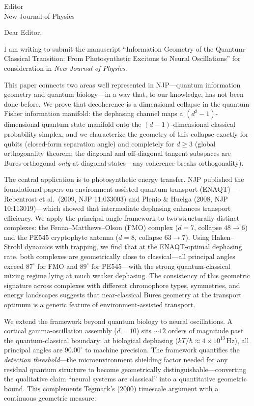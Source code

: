 \documentclass[12pt,a4paper]{letter}
\begin{document}
\begin{letter}{Editor\\New Journal of Physics}

\opening{Dear Editor,}

I am writing to submit the manuscript ``Information Geometry of the Quantum-Classical Transition: From Photosynthetic Excitons to Neural Oscillations'' for consideration in \textit{New Journal of Physics}.

This paper connects two areas well represented in NJP---quantum information geometry and quantum biology---in a way that, to our knowledge, has not been done before. We prove that decoherence is a dimensional collapse in the quantum Fisher information manifold: the dephasing channel maps a $(d^2-1)$-dimensional quantum state manifold onto the $(d-1)$-dimensional classical probability simplex, and we characterize the geometry of this collapse exactly for qubits (closed-form separation angle) and completely for $d \geq 3$ (global orthogonality theorem: the diagonal and off-diagonal tangent subspaces are Bures-orthogonal \emph{only} at diagonal states---any coherence breaks orthogonality).

The central application is to photosynthetic energy transfer. NJP published the foundational papers on environment-assisted quantum transport (ENAQT)---Rebentrost et al.\ (2009, NJP 11:033003) and Plenio \& Huelga (2008, NJP 10:113019)---which showed that intermediate dephasing enhances transport efficiency. We apply the principal angle framework to two structurally distinct complexes: the Fenna--Matthews--Olson (FMO) complex ($d = 7$, collapse $48 \to 6$) and the PE545 cryptophyte antenna ($d = 8$, collapse $63 \to 7$). Using Haken--Strobl dynamics with trapping, we find that at the ENAQT-optimal dephasing rate, both complexes are geometrically close to classical---all principal angles exceed $87^\circ$ for FMO and $89^\circ$ for PE545---with the strong quantum-classical mixing regime lying at much weaker dephasing. The consistency of this geometric signature across complexes with different chromophore types, symmetries, and energy landscapes suggests that near-classical Bures geometry at the transport optimum is a generic feature of environment-assisted transport.

We extend the framework beyond quantum biology to neural oscillations. A cortical gamma-oscillation assembly ($d = 10$) sits ${\sim}12$ orders of magnitude past the quantum-classical boundary: at biological dephasing ($kT/\hbar \approx 4 \times 10^{13}$\,Hz), all principal angles are $90.00^\circ$ to machine precision. The framework quantifies the \emph{detection threshold}---the microenvironment shielding factor needed for any residual quantum structure to become geometrically distinguishable---converting the qualitative claim ``neural systems are classical'' into a quantitative geometric bound. This complements Tegmark's (2000) timescale argument with a continuous geometric measure.


\end{letter}
\end{document}
